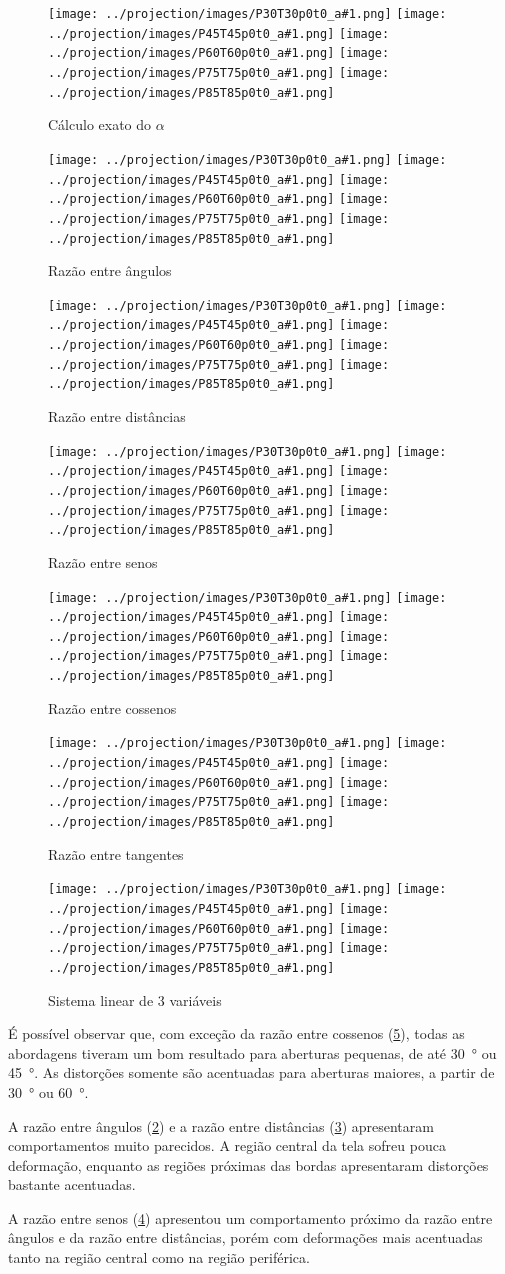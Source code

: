 \documentclass[brazil,pagestart=firstchapter]{abnt}
\newcommand*{\resultadoimagens}[1]{
	\texttt{[image: ../projection/images/P30T30p0t0\_a\#1.png]}
	\texttt{[image: ../projection/images/P45T45p0t0\_a\#1.png]}
	\texttt{[image: ../projection/images/P60T60p0t0\_a\#1.png]}
	\texttt{[image: ../projection/images/P75T75p0t0\_a\#1.png]}
	\texttt{[image: ../projection/images/P85T85p0t0\_a\#1.png]}
}
\begin{document}
\begin{figure}
\centering
\resultadoimagens{12}
\caption{Cálculo exato do $\alpha$}
\label{fig:resultado_exact}
\end{figure}

\begin{figure}
\centering
\resultadoimagens{7}
\caption{Razão entre ângulos}
\label{fig:resultado_angulo}
\end{figure}

\begin{figure}
\centering
\resultadoimagens{11}
\caption{Razão entre distâncias}
\label{fig:resultado_dist}
\end{figure}

\begin{figure}
\centering
\resultadoimagens{9}
\caption{Razão entre senos}
\label{fig:resultado_sin}
\end{figure}


\begin{figure}
\centering
\resultadoimagens{8}
\caption{Razão entre cossenos}
\label{fig:resultado_cos}
\end{figure}

\begin{figure}
\centering
\resultadoimagens{10}
\caption{Razão entre tangentes}
\label{fig:resultado_tan}
\end{figure}

\begin{figure}
\centering
\resultadoimagens{13}
\caption{Sistema linear de 3 variáveis}
\label{fig:resultado_lineq}
\end{figure}

É possível observar que, com exceção da razão entre cossenos
(\ref{fig:resultado_cos}), todas as abordagens tiveram um bom resultado para
aberturas pequenas, de até \SI{30}{\degree} ou \SI{45}{\degree}. As
distorções somente são acentuadas para aberturas maiores, a partir de
\SI{30}{\degree} ou \SI{60}{\degree}.

A razão entre ângulos (\ref{fig:resultado_angulo}) e a razão entre
distâncias (\ref{fig:resultado_dist}) apresentaram comportamentos muito
parecidos. A região central da tela sofreu pouca deformação, enquanto as
regiões próximas das bordas apresentaram distorções bastante acentuadas.

A razão entre senos (\ref{fig:resultado_sin}) apresentou um comportamento
próximo da razão entre ângulos e da razão entre distâncias, porém com
deformações mais acentuadas tanto na região central como na região
periférica.
\end{document}

